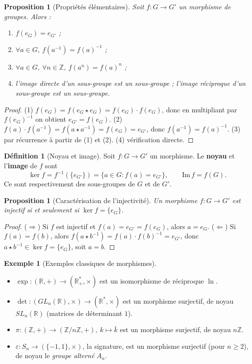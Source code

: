 \documentclass[12pt,a4paper]{report}
\newtheorem{proposition}[theoreme]{Proposition}
\theoremstyle{definition}
\newtheorem{definition}{Définition}[section]
\newtheorem{exemple}{Exemple}[section]
\theoremstyle{remark}
\begin{document}
\begin{proposition}[Propriétés élémentaires]
Soit $f : G \to G'$ un morphisme de groupes. Alors :
\begin{enumerate}
    \item $f(e_G) = e_{G'}$ ;
    \item $\forall a \in G,\ f(a^{-1}) = f(a)^{-1}$ ;
    \item $\forall a \in G,\ \forall n \in \mathbb{Z},\ f(a^n) = f(a)^n$ ;
    \item l'image directe d'un sous-groupe est un sous-groupe ; l'image réciproque d'un sous-groupe est un sous-groupe.
\end{enumerate}
\end{proposition}

\begin{proof}
(1) $f(e_G) = f(e_G \star e_G) = f(e_G) \cdot f(e_G)$, donc en multipliant par $f(e_G)^{-1}$ on obtient $e_{G'} = f(e_G)$. (2) $f(a) \cdot f(a^{-1}) = f(a \star a^{-1}) = f(e_G) = e_{G'}$, donc $f(a^{-1}) = f(a)^{-1}$. (3) par récurrence à partir de (1) et (2). (4) vérification directe.
\end{proof}

\begin{definition}[Noyau et image]
Soit $f : G \to G'$ un morphisme. Le \textbf{noyau} et l'\textbf{image} de $f$ sont
\[ \ker f = f^{-1}(\{e_{G'}\}) = \{a \in G : f(a) = e_{G'}\}, \qquad \mathrm{Im}\, f = f(G). \]
Ce sont respectivement des sous-groupes de $G$ et de $G'$.
\end{definition}

\begin{proposition}[Caractérisation de l'injectivité]
Un morphisme $f : G \to G'$ est injectif si et seulement si $\ker f = \{e_G\}$.
\end{proposition}

\begin{proof}
($\Rightarrow$) Si $f$ est injectif et $f(a) = e_{G'} = f(e_G)$, alors $a = e_G$. ($\Leftarrow$) Si $f(a) = f(b)$, alors $f(a \star b^{-1}) = f(a) \cdot f(b)^{-1} = e_{G'}$, donc $a \star b^{-1} \in \ker f = \{e_G\}$, soit $a = b$.
\end{proof}

\begin{exemple}[Exemples classiques de morphismes]
\begin{itemize}
    \item $\exp : (\mathbb{R}, +) \to (\mathbb{R}^*_+, \times)$ est un isomorphisme de réciproque $\ln$.
    \item $\det : (GL_n(\mathbb{R}), \times) \to (\mathbb{R}^*, \times)$ est un morphisme surjectif, de noyau $SL_n(\mathbb{R})$ (matrices de déterminant $1$).
    \item $\pi : (\mathbb{Z}, +) \to (\mathbb{Z}/n\mathbb{Z}, +),\ k \mapsto \bar{k}$ est un morphisme surjectif, de noyau $n\mathbb{Z}$.
    \item $\varepsilon : S_n \to (\{-1, 1\}, \times)$, la signature, est un morphisme surjectif (pour $n \ge 2$), de noyau le \emph{groupe alterné} $A_n$.
\end{itemize}
\end{exemple}
\end{document}
